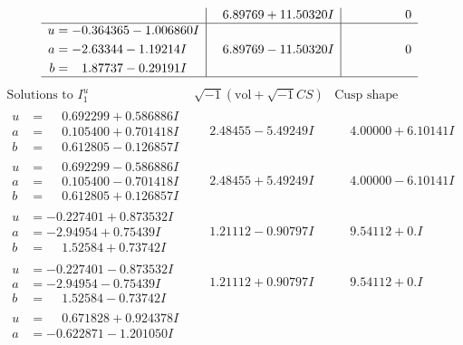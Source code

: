 \documentclass[1p]{elsarticle_modified}
\theoremstyle{definition}
\newcommand{\I}{\sqrt{-1}}
\begin{document}
$$\begin{array}{c|c|c}
 & \phantom{-}6.89769 + 11.50320 I & \phantom{-0.000000 } 0 \\ \hline\begin{aligned}
u &= -0.364365 - 1.006860 I \\
a &= -2.63344 - 1.19214 I \\
b &= \phantom{-}1.87737 - 0.29191 I\end{aligned}
 & \phantom{-}6.89769 - 11.50320 I & \phantom{-0.000000 } 0\\
 \hline 
 \end{array}$$\newpage$$\begin{array}{c|c|c}  
\text{Solutions to }I^u_{1}& \I (\text{vol} + \sqrt{-1}CS) & \text{Cusp shape}\\
 \hline 
\begin{aligned}
u &= \phantom{-}0.692299 + 0.586886 I \\
a &= \phantom{-}0.105400 + 0.701418 I \\
b &= \phantom{-}0.612805 - 0.126857 I\end{aligned}
 & \phantom{-}2.48455 - 5.49249 I & \phantom{-}4.00000 + 6.10141 I \\ \hline\begin{aligned}
u &= \phantom{-}0.692299 - 0.586886 I \\
a &= \phantom{-}0.105400 - 0.701418 I \\
b &= \phantom{-}0.612805 + 0.126857 I\end{aligned}
 & \phantom{-}2.48455 + 5.49249 I & \phantom{-}4.00000 - 6.10141 I \\ \hline\begin{aligned}
u &= -0.227401 + 0.873532 I \\
a &= -2.94954 + 0.75439 I \\
b &= \phantom{-}1.52584 + 0.73742 I\end{aligned}
 & \phantom{-}1.21112 - 0.90797 I & \phantom{-}9.54112 + 0. I\phantom{ +0.000000I} \\ \hline\begin{aligned}
u &= -0.227401 - 0.873532 I \\
a &= -2.94954 - 0.75439 I \\
b &= \phantom{-}1.52584 - 0.73742 I\end{aligned}
 & \phantom{-}1.21112 + 0.90797 I & \phantom{-}9.54112 + 0. I\phantom{ +0.000000I} \\ \hline\begin{aligned}
u &= \phantom{-}0.671828 + 0.924378 I \\
a &= -0.622871 - 1.201050 I \\

\end{aligned}
\end{array}$$
\end{document}
